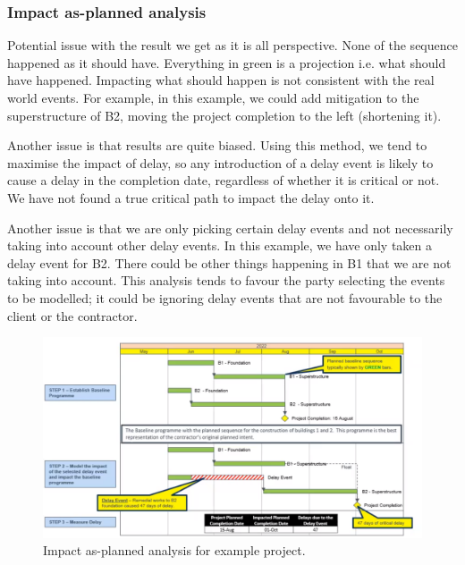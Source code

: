 \subsubsection{Impact as-planned analysis}
Potential issue with the result we get as it is all perspective. None of the sequence happened as it should have. Everything in green is a projection i.e. what should have happened. Impacting what should happen is not consistent with the real world events. For example, in this example, we could add mitigation to the superstructure of B2, moving the project completion to the left (shortening it).

Another issue is that results are quite biased. Using this method, we tend to maximise the impact of delay, so any introduction of a delay event is likely to cause a delay in the completion date, regardless of whether it is critical or not. We have not found a true critical path to impact the delay onto it.

Another issue is that we are only picking certain delay events and not necessarily taking into account other delay events. In this example, we have only taken a delay event for B2. There could be other things happening in B1 that we are not taking into account. This analysis tends to favour the party selecting the events to be modelled; it could be ignoring delay events that are not favourable to the client or the contractor.
\begin{figure}[H]
    \centering
    \includegraphics[width = \textwidth]{img/figure31.png}
    \caption{Impact as-planned analysis for example project.}
\end{figure}
